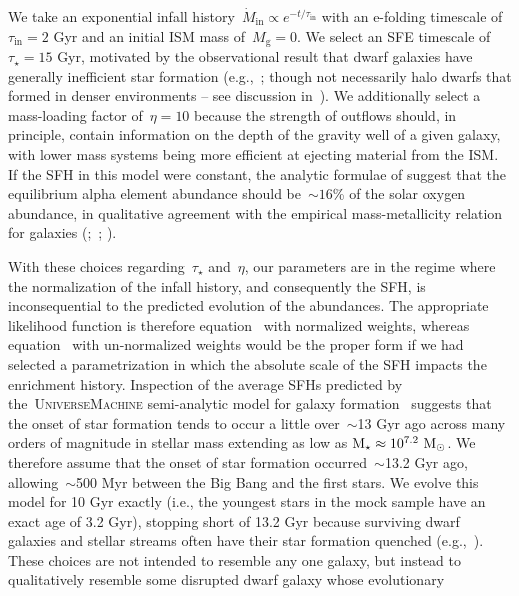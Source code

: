 \documentclass[ms.tex]{subfiles}
\begin{document}
We take an exponential infall history~$\dot{M}_\text{in} \propto e^{-t /
\tau_\text{in}}$ with an e-folding timescale of~$\tau_\text{in} = 2$ Gyr and an
initial ISM mass of~$M_\text{g} = 0$.
We select an SFE timescale of~$\tau_\star = 15$ Gyr, motivated by the
observational result that dwarf galaxies have generally inefficient star
formation (e.g.,~\citealp{Hudson2015}; though not necessarily halo dwarfs that
formed in denser environments -- see discussion in~\citealt{Naidu2022}).
We additionally select a mass-loading factor of~$\eta = 10$ because the
strength of outflows should, in principle, contain information on the depth of
the gravity well of a given galaxy, with lower mass systems being more
efficient at ejecting material from the ISM.
If the SFH in this model were constant, the analytic formulae of
\citet{Weinberg2017} suggest that the equilibrium alpha element abundance
should be~$\sim16$\% of the solar oxygen abundance, in qualitative agreement
with the empirical mass-metallicity relation for galaxies
(\citealp{Tremonti2004, Gallazzi2005};~\citealp*{Zahid2011};
\citealp{Andrews2013, Kirby2013, Zahid2014}).
\par
With these choices regarding~$\tau_\star$ and~$\eta$, our parameters are in
the regime where the normalization of the infall history, and consequently the
SFH, is inconsequential to the predicted evolution of the abundances.
The appropriate likelihood function is therefore equation~
with normalized weights, whereas equation~ with
un-normalized weights would be the proper form if we had selected a
parametrization in which the absolute scale of the SFH impacts the enrichment
history.
Inspection of the average SFHs predicted by the~\textsc{UniverseMachine}
semi-analytic model for galaxy formation~\citep{Behroozi2019} suggests that the
onset of star formation tends to occur a little over~$\sim$13 Gyr ago across
many orders of magnitude in stellar mass extending as low as
$\text{M}_\star \approx 10^{7.2}~\text{M}_\odot$.
We therefore assume that the onset of star formation occurred~$\sim$13.2 Gyr
ago, allowing~$\sim$500 Myr between the Big Bang and the first stars.
We evolve this model for 10 Gyr exactly (i.e., the youngest stars in the mock
sample have an exact age of 3.2 Gyr), stopping short of 13.2 Gyr because
surviving dwarf galaxies and stellar streams often have their star formation
quenched (e.g.,~\citealp{Monelli2010a, Monelli2010b, Sohn2013, Weisz2014a,
Weisz2014b, Weisz2015}).
These choices are not intended to resemble any one galaxy, but instead to
qualitatively resemble some disrupted dwarf galaxy whose evolutionary
\end{document}
